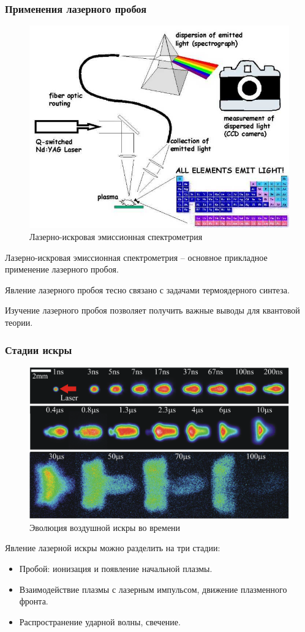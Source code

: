 \documentclass{beamer}
\begin{document}
	\begin{frame}
		\frametitle{Применения лазерного пробоя}
	
		\begin{figure}
			\centering
			\includegraphics[width=0.5\linewidth]{res/libs.jpg}
			\caption*{Лазерно-искровая эмиссионная спектрометрия}
		\end{figure}
			
		Лазерно-искровая эмиссионная спектрометрия --  основное прикладное применение лазерного пробоя.
		
		Явление лазерного пробоя тесно связано с задачами термоядерного синтеза.
		
		Изучение лазерного пробоя позволяет получить важные выводы для квантовой теории.
		
	\end{frame}
	
	\begin{frame}
		\frametitle{Стадии искры}
		\begin{figure}
			\centering
			\includegraphics[width=0.8\linewidth]{res/spark_evolution.png}
			\caption*{Эволюция воздушной искры во времени}
		\end{figure}
		\vspace{-5pt}
		Явление лазерной искры можно разделить на три стадии:
		\begin{itemize}
			\item Пробой: ионизация и появление начальной плазмы.
			\item Взаимодействие плазмы с лазерным импульсом, движение плазменного фронта.
			\item Распространение ударной волны, свечение.
		\end{itemize}
	\end{frame}
	
\end{document}
